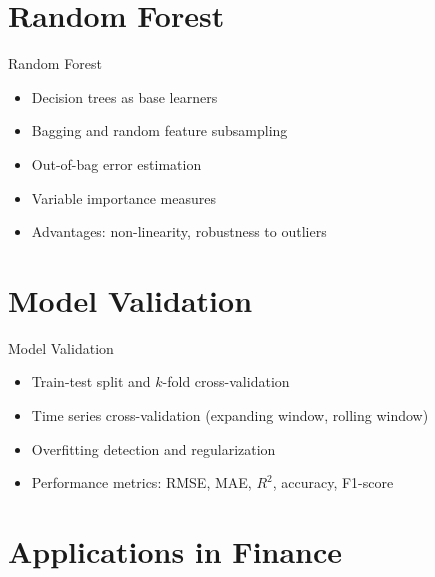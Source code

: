 \documentclass[9pt, aspectratio=169, t]{beamer}
\theoremstyle{definition}
\begin{document}
\section{Random Forest}

\begin{frame}{Random Forest}
    \begin{itemize}
        \item Decision trees as base learners
        \item Bagging and random feature subsampling
        \item Out-of-bag error estimation
        \item Variable importance measures
        \item Advantages: non-linearity, robustness to outliers
    \end{itemize}
\end{frame}

\section{Model Validation}

\begin{frame}{Model Validation}
    \begin{itemize}
        \item Train-test split and $k$-fold cross-validation
        \item Time series cross-validation (expanding window, rolling window)
        \item Overfitting detection and regularization
        \item Performance metrics: RMSE, MAE, $R^2$, accuracy, F1-score
    \end{itemize}
\end{frame}

\section{Applications in Finance}
\end{document}
